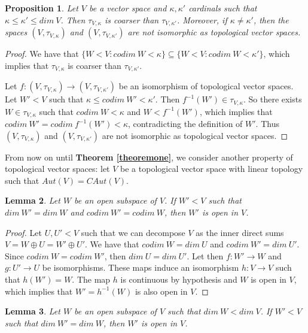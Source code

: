 \documentclass[a4paper,12pt]{article}
\newtheorem{prop}{Proposition}[section]
\newtheorem{lema}[prop]{Lemma}
\theoremstyle{bloco}
\begin{document}
\begin{prop}\label{differentspaces}Let $V$ be a vector space and $\kappa,\kappa'$ cardinals such that $\kappa \leqslant \kappa' \leqslant dim \ V$. Then $\tau_{V,\kappa}$ is coarser than $\tau_{V,\kappa'}$. Moreover, if $\kappa \neq \kappa'$, then the spaces $(V,\tau_{V,\kappa})$ and $(V,\tau_{V,\kappa'})$ are not isomorphic as topological vector spaces.
\end{prop}

\begin{proof}We have that $\{W < V: codim \ W < \kappa\} \subseteq \{W < V: codim \ W < \kappa'\}$, which implies that $\tau_{V,\kappa}$ is coarser than $\tau_{V,\kappa'}$.

Let $f: (V,\tau_{V,\kappa}) \rightarrow (V,\tau_{V,\kappa'})$ be an isomorphism of topological vector spaces. Let $W' < V$ such that $\kappa \leqslant codim \ W' < \kappa'$. Then $f^{-1}(W') \in \tau_{V,\kappa}$. So there exists $W \in \tau_{V,\kappa}$ such that $codim \ W < \kappa$ and $W < f^{-1}(W')$, which implies that $codim \ W' = codim \ f^{-1}(W') < \kappa$, contradicting the definition of $W'$. Thus $(V,\tau_{V,\kappa})$ and $(V,\tau_{V,\kappa'})$ are not isomorphic as topological vector spaces.
\end{proof}

From now on until \textbf{Theorem \ref{theoremone}}, we consider another property of topological vector spaces: let $V$ be a topological vector space with linear topology such that $Aut(V) = CAut(V)$.

\begin{lema}\label{equaldimandcodim} Let $W$ be an open subspace of $V$. If $W' < V$ such that $dim \ W' = dim \ W$ and $codim \ W' = codim \ W$, then $W'$ is open in $V$. 
\end{lema}

\begin{proof}Let $U, U' < V$ such that we can decompose $V$ as the inner direct sums $V = W \oplus U = W' \oplus U'$. We have that $codim \ W = dim \ U$ and $codim \ W' = dim \ U'$. Since $codim \ W = codim \ W'$, then $dim \ U = dim \ U'$. Let then $f: W' \rightarrow W$ and $g: U' \rightarrow U$ be isomorphisms. These maps induce an isomorphism $h: V \rightarrow V$ such that $h(W') = W$. The map $h$ is continuous by hypothesis and $W$ is open in $V$, which implies that $W' = h^{-1}(W)$ is also open in $V$.
\end{proof}

\begin{lema}\label{equaldim}Let $W$ be an open subspace of $V$ such that $dim \ W < dim \ V$. If $W' < V$ such that $dim \ W' = dim \ W$, then $W'$ is open in $V$. 
\end{lema}
\end{document}
